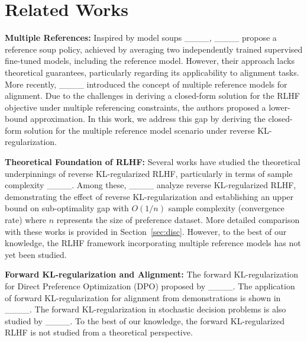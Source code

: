 \section{Related Works}
\textbf{Multiple References:} Inspired by model soups ____, ____ propose a reference soup policy, achieved by averaging two independently trained supervised fine-tuned models, including the reference model. However, their approach lacks theoretical guarantees, particularly regarding its applicability to alignment tasks. More recently, ____ introduced the concept of multiple reference models for alignment. Due to the challenges in deriving a closed-form solution for the RLHF objective under multiple referencing constraints, the authors proposed a lower-bound approximation. In this work, we address this gap by deriving the closed-form solution for the multiple reference model scenario under reverse KL-regularization.

\textbf{Theoretical Foundation of RLHF:} Several works have studied the theoretical underpinnings of reverse KL-regularized RLHF, particularly in terms of sample complexity ____. Among these, ____ analyze reverse KL-regularized RLHF, demonstrating the effect of reverse KL-regularization and establishing an upper bound on sub-optimality gap with $O(1/n)$ sample complexity (convergence rate)  where $n$ represents the size of preference dataset. More detailed comparison with these works is provided in Section~\ref{sec:disc}. However, to the best of our knowledge, the RLHF framework incorporating multiple reference models has not yet been studied. 

\textbf{Forward KL-regularization and Alignment:} The forward KL-regularization for Direct Preference Optimization (DPO) proposed by ____. The application of forward KL-regularization for alignment from demonstrations is shown in ____. The forward KL-regularization in stochastic decision problems is also studied by ____. To the best of our knowledge, the forward KL-regularized RLHF is not studied from a theoretical perspective.
